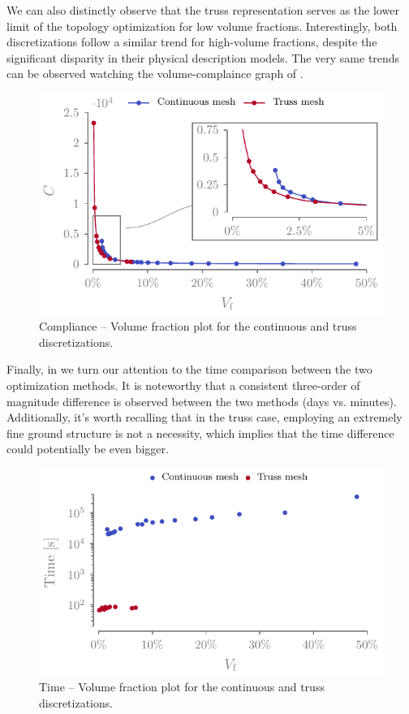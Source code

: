 We can also distinctly observe that the truss representation serves as the lower limit of the topology optimization for low volume fractions. Interestingly, both discretizations follow a similar trend for high-volume fractions, despite the significant disparity in their physical description models. The very same trends can be observed watching the volume-complaince graph of .
\begin{figure}
    \centering
    \includegraphics{figures/03_comparison_TO_TTO/16_comp_vol/comp_vol.pdf}
    \caption{Compliance -- Volume fraction plot for the continuous and truss discretizations.}
    \label{fig:03_comp_vol}
\end{figure}

Finally, in  we turn our attention to the time comparison between the two optimization methods. It is noteworthy that a consistent three-order of magnitude difference is observed between the two methods (days vs. minutes). Additionally, it's worth recalling that in the truss case, employing an extremely fine ground structure is not a necessity, which implies that the time difference could potentially be even bigger.

\begin{figure}
    \centering
    \includegraphics{figures/03_comparison_TO_TTO/17_time_vol/time_vol.pdf}
    \caption{Time -- Volume fraction plot for the continuous and truss discretizations.}
    \label{fig:03_time_vol}
\end{figure}

